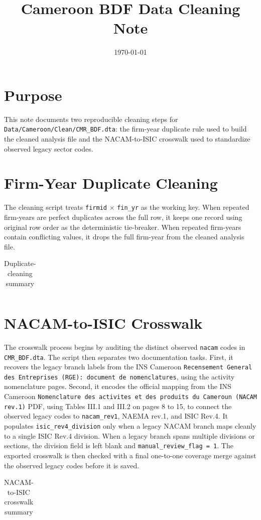 \documentclass[11pt]{article}
\title{Cameroon BDF Data Cleaning Note}
\author{}
\date{\today}
\begin{document}
\maketitle

\section{Purpose}

This note documents two reproducible cleaning steps for \texttt{Data/Cameroon/Clean/CMR\_BDF.dta}: the firm-year duplicate rule used to build the cleaned analysis file and the NACAM-to-ISIC crosswalk used to standardize observed legacy sector codes.

\section{Firm-Year Duplicate Cleaning}

The cleaning script treats \texttt{firmid} $\times$ \texttt{fin\_yr} as the working key. When repeated firm-years are perfect duplicates across the full row, it keeps one record using original row order as the deterministic tie-breaker. When repeated firm-years contain conflicting values, it drops the full firm-year from the cleaned analysis file.

\begin{table}[H]
\centering
\caption{Duplicate-cleaning summary}
\label{tab:duplicate-cleaning}
\begin{tabular}{lr}

\end{tabular}
\end{table}

\section{NACAM-to-ISIC Crosswalk}

The crosswalk process begins by auditing the distinct observed \texttt{nacam} codes in \texttt{CMR\_BDF.dta}. The script then separates two documentation tasks. First, it recovers the legacy branch labels from the INS Cameroon \texttt{Recensement General des Entreprises (RGE): document de nomenclatures}, using the activity nomenclature pages. Second, it encodes the official mapping from the INS Cameroon \texttt{Nomenclature des activites et des produits du Cameroun (NACAM rev.1)} PDF, using Tables III.1 and III.2 on pages 8 to 15, to connect the observed legacy codes to \texttt{nacam\_rev1}, NAEMA rev.1, and ISIC Rev.4. It populates \texttt{isic\_rev4\_division} only when a legacy NACAM branch maps cleanly to a single ISIC Rev.4 division. When a legacy branch spans multiple divisions or sections, the division field is left blank and \texttt{manual\_review\_flag = 1}. The exported crosswalk is then checked with a final one-to-one coverage merge against the observed legacy codes before it is saved.

\begin{table}[H]
\centering
\caption{NACAM-to-ISIC crosswalk summary}
\label{tab:crosswalk-summary}
\begin{tabular}{lr}

\end{tabular}
\end{table}
\end{document}
